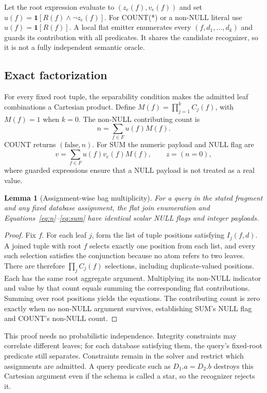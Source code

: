 \documentclass[3p,times,authoryear]{elsarticle}
\newtheorem{lemma}{Lemma}
\newcommand{\ind}[1]{\mathbf{1}[#1]}
\begin{document}
Let the root expression evaluate to $(z_e(f),v_e(f))$ and set $u(f)=\ind{R(f)\land\neg z_e(f)}$. For COUNT(*) or a non-NULL literal use $u(f)=\ind{R(f)}$. A local flat emitter enumerates every $(f,d_1,\ldots,d_k)$ and guards its contribution with all predicates. It shares the candidate recognizer, so it is not a fully independent semantic oracle.

\subsection{Exact factorization}
For every fixed root tuple, the separability condition makes the admitted leaf combinations a Cartesian product. Define $M(f)=\prod_{j=1}^{k}C_j(f)$, with $M(f)=1$ when $k=0$. The non-NULL contributing count is
\begin{equation}
 n=\sum_{f\in F}u(f)M(f).
 \label{eq:n}
\end{equation}
COUNT returns $(\mathrm{false},n)$. For SUM the numeric payload and NULL flag are
\begin{equation}
 v=\sum_{f\in F}u(f)v_e(f)M(f),\qquad z=(n=0),
 \label{eq:sum}
\end{equation}
where guarded expressions ensure that a NULL payload is not treated as a real value.

\begin{lemma}[Assignment-wise bag multiplicity]
For a query in the stated fragment and any fixed database assignment, the flat join enumeration and Equations~\eqref{eq:n}--\eqref{eq:sum} have identical scalar NULL flags and integer payloads.
\end{lemma}
\begin{proof}
Fix $f$. For each leaf $j$, form the list of tuple positions satisfying $I_j(f,d)$. A joined tuple with root $f$ selects exactly one position from each list, and every such selection satisfies the conjunction because no atom refers to two leaves. There are therefore $\prod_j C_j(f)$ selections, including duplicate-valued positions. Each has the same root aggregate argument. Multiplying its non-NULL indicator and value by that count equals summing the corresponding flat contributions. Summing over root positions yields the equations. The contributing count is zero exactly when no non-NULL argument survives, establishing SUM's NULL flag and COUNT's non-NULL count.
\end{proof}

This proof needs no probabilistic independence. Integrity constraints may correlate different leaves; for each database satisfying them, the query's fixed-root predicate still separates. Constraints remain in the solver and restrict which assignments are admitted. A query predicate such as $D_1.a=D_2.b$ destroys this Cartesian argument even if the schema is called a star, so the recognizer rejects it.
\end{document}
